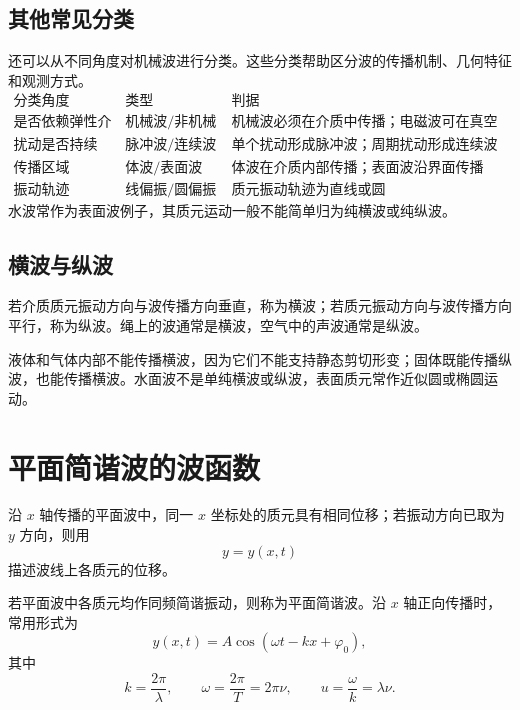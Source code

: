 \subsection*{其他常见分类}

还可以从不同角度对机械波进行分类。这些分类帮助区分波的传播机制、几何特征和观测方式。
\[
\begin{array}{c|c|c}
\text{分类角度} & \text{类型} & \text{判据}\\
\hline
\text{是否依赖弹性介质} & \text{机械波/非机械波} & \text{机械波必须在介质中传播；电磁波可在真空中传播}\\
\text{扰动是否持续} & \text{脉冲波/连续波} & \text{单个扰动形成脉冲波；周期扰动形成连续波}\\
\text{传播区域} & \text{体波/表面波} & \text{体波在介质内部传播；表面波沿界面传播}\\
\text{振动轨迹} & \text{线偏振/圆偏振} & \text{质元振动轨迹为直线或圆}
\end{array}
\]
水波常作为表面波例子，其质元运动一般不能简单归为纯横波或纯纵波。

\subsection*{横波与纵波}

\begin{definition}[横波与纵波]\label{def:transverse-longitudinal}
若介质质元振动方向与波传播方向垂直，称为横波；若质元振动方向与波传播方向平行，称为纵波。绳上的波通常是横波，空气中的声波通常是纵波。
\end{definition}

液体和气体内部不能传播横波，因为它们不能支持静态剪切形变；固体既能传播纵波，也能传播横波。水面波不是单纯横波或纵波，表面质元常作近似圆或椭圆运动。

\section{平面简谐波的波函数}

沿 $x$ 轴传播的平面波中，同一 $x$ 坐标处的质元具有相同位移；若振动方向已取为 $y$ 方向，则用
\[
  y=y(x,t)
\]
描述波线上各质元的位移。

\begin{definition}[平面简谐波]\label{def:plane-harmonic-wave}
若平面波中各质元均作同频简谐振动，则称为平面简谐波。沿 $x$ 轴正向传播时，常用形式为
\[
  y(x,t)=A\cos(\omega t-kx+\varphi_0),
\]
其中
\[
  k=\frac{2\pi}{\lambda},\qquad
  \omega=\frac{2\pi}{T}=2\pi\nu,\qquad
  u=\frac{\omega}{k}=\lambda\nu.
\]
\end{definition}

